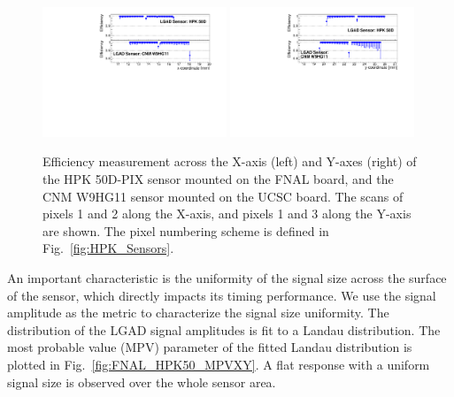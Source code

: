 \documentclass[preprint,1p]{elsarticle}
\begin{document}
\begin{figure}[htbp] 
\centering
\includegraphics[width=0.49\textwidth]{figs/HPK50DVsCNM_Efficiency_vs_X.pdf} 
\includegraphics[width=0.49\textwidth]{figs/HPK50DVsCNM_Efficiency_vs_Y.pdf} 
\caption{Efficiency measurement across the X-axis (left) and Y-axes (right) of the HPK 50D-PIX sensor 
mounted on the FNAL board, and the CNM W9HG11 sensor mounted on the UCSC board. The scans of pixels 1 and 2 
along the X-axis, and pixels 1 and 3 along the Y-axis are shown.
The pixel numbering scheme is defined in Fig.~\ref{fig:HPK_Sensors}.} 
\label{fig:FNAL_HPK50_effXY} 
\end{figure} 


An important characteristic is the uniformity of the signal size
across the surface of the sensor, which directly impacts its timing performance. We use the signal amplitude as the metric to characterize the signal
size uniformity. The distribution of the LGAD signal amplitudes is fit to a
Landau distribution. The most probable value (MPV) parameter of the fitted
Landau distribution is plotted in Fig.~\ref{fig:FNAL_HPK50_MPVXY}. 
A flat response with a uniform signal size is observed over the whole sensor area.
\end{document}
